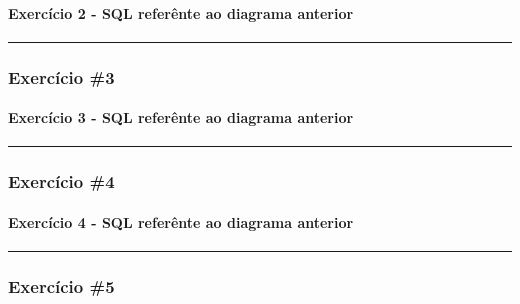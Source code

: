 \documentclass[
]{book}
\makeatletter
\newcommand*\pandocbounded[1]{%
  \sbox\pandoc@box{#1}%
  \Gscale@div\@tempa{\textheight}{\dimexpr\ht\pandoc@box+\dp\pandoc@box\relax}%
  \Gscale@div\@tempb{\linewidth}{\wd\pandoc@box}%
  \ifdim\@tempb\p@<\@tempa\p@\let\@tempa\@tempb\fi%
  \ifdim\@tempa\p@<\p@\scalebox{\@tempa}{\usebox\pandoc@box}%
  \else\usebox{\pandoc@box}%
  \fi%
}
\makeatother
\begin{document}
\pandocbounded{}

\paragraph{Exercício 2 - SQL referênte ao diagrama anterior}\label{exercuxedcio-2---sql-referuxeante-ao-diagrama-anterior}

\begin{center}\rule{0.5\linewidth}{0.5pt}\end{center}

\subsubsection{Exercício \#3}\label{exercuxedcio-3}

\pandocbounded{}

\paragraph{Exercício 3 - SQL referênte ao diagrama anterior}\label{exercuxedcio-3---sql-referuxeante-ao-diagrama-anterior}

\begin{center}\rule{0.5\linewidth}{0.5pt}\end{center}

\subsubsection{Exercício \#4}\label{exercuxedcio-4}

\pandocbounded{}

\paragraph{Exercício 4 - SQL referênte ao diagrama anterior}\label{exercuxedcio-4---sql-referuxeante-ao-diagrama-anterior}

\begin{center}\rule{0.5\linewidth}{0.5pt}\end{center}

\subsubsection{Exercício \#5}\label{exercuxedcio-5}
\end{document}
